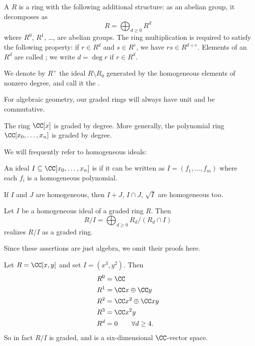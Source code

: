 \documentclass[11pt]{scrreprt}
\begin{document}
\begin{definition}
	A  $R$ is a ring with the following additional structure:
	as an abelian group, it decomposes as
	\[ R = \bigoplus_{d \ge 0} R^d \]
	where $R^0$, $R^1$, \dots, are abelian groups.
	The ring multiplication is required to satisfy the following property:
	if $r \in R^d$ and $s \in R^e$, we have $rs \in R^{d+e}$.
	Elements of an $R^d$ are called ;
	we write $d = \deg r$ if $r \in R^d$.

	We denote by $R^+$ the ideal $R \setminus R_0$ generated by
	the homogeneous elements of nonzero degree,
	and call it the .
\end{definition}
\begin{remark}
	For algebraic geometry,
	our graded rings will always have unit and be commutative.
\end{remark}
\begin{example}
	\listhack
	\begin{enumerate}[(a)]
		\ii The ring $\CC[x]$ is graded by degree.
		\ii More generally, the polynomial ring $\CC[x_0, \dots, x_n]$
		is graded by degree.
	\end{enumerate}
\end{example}

We will frequently refer to homogeneous ideals:
\begin{definition}
	An ideal $I \subseteq \CC[x_0, \dots, x_n]$ is 
	if it can be written as $I = (f_1, \dots, f_m)$
	where each $f_i$ is a homogeneous polynomial.
\end{definition}
\begin{remark}
	If $I$ and $J$ are homogeneous,
	then $I+J$, $I \cap J$, $\sqrt I$ are homogeneous too.
\end{remark}
\begin{lemma}
	Let $I$ be a homogeneous ideal of a graded ring $R$.
	Then
	\[ R/I = \bigoplus_{d \ge 0} R_d / (R_d \cap I) \]
	realizes $R/I$ as a graded ring.
\end{lemma}
Since these assertions are just algebra,
we omit their proofs here.
\begin{example}
	Let $R = \CC[x,y]$ and set $I = (x^3, y^2)$. Then
	\begin{align*}
		R^0 &= \CC \\
		R^1 &= \CC x \oplus \CC y \\
		R^2 &= \CC x^2 \oplus \CC xy \\
		R^3 &= \CC x^2y \\
		R^d &= 0 \qquad \forall d \ge 4.
	\end{align*}
	So in fact $R/I$ is graded, and is a six-dimensional $\CC$-vector space.
\end{example}
\end{document}
